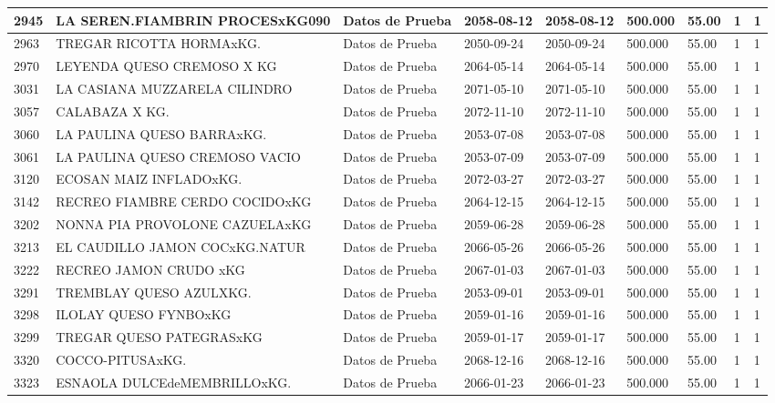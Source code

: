 \documentclass[a4paper,12pt]{article}
\begin{document}
\begin{landscape}
\begin{longtable}{|p{4cm}|p{2.5cm}|p{2.5cm}|p{1.8cm}|p{1.8cm}|p{1cm}|p{1cm}|p{3cm}|p{3cm}||}
2945 & LA SEREN.FIAMBRIN PROCESxKG090 & Datos de Prueba & 2058-08-12 & 2058-08-12 & 500.000 & 55.00 & 1 & 1 \\ \hline 
2963 & TREGAR RICOTTA HORMAxKG. & Datos de Prueba & 2050-09-24 & 2050-09-24 & 500.000 & 55.00 & 1 & 1 \\ \hline 
2970 & LEYENDA QUESO CREMOSO X KG & Datos de Prueba & 2064-05-14 & 2064-05-14 & 500.000 & 55.00 & 1 & 1 \\ \hline 
3031 & LA CASIANA MUZZARELA CILINDRO & Datos de Prueba & 2071-05-10 & 2071-05-10 & 500.000 & 55.00 & 1 & 1 \\ \hline 
3057 & CALABAZA X KG. & Datos de Prueba & 2072-11-10 & 2072-11-10 & 500.000 & 55.00 & 1 & 1 \\ \hline 
3060 & LA PAULINA QUESO BARRAxKG. & Datos de Prueba & 2053-07-08 & 2053-07-08 & 500.000 & 55.00 & 1 & 1 \\ \hline 
3061 & LA PAULINA QUESO CREMOSO VACIO & Datos de Prueba & 2053-07-09 & 2053-07-09 & 500.000 & 55.00 & 1 & 1 \\ \hline 
3120 & ECOSAN MAIZ INFLADOxKG. & Datos de Prueba & 2072-03-27 & 2072-03-27 & 500.000 & 55.00 & 1 & 1 \\ \hline 
3142 & RECREO FIAMBRE CERDO COCIDOxKG & Datos de Prueba & 2064-12-15 & 2064-12-15 & 500.000 & 55.00 & 1 & 1 \\ \hline 
3202 & NONNA PIA PROVOLONE CAZUELAxKG & Datos de Prueba & 2059-06-28 & 2059-06-28 & 500.000 & 55.00 & 1 & 1 \\ \hline 
3213 & EL CAUDILLO JAMON COCxKG.NATUR & Datos de Prueba & 2066-05-26 & 2066-05-26 & 500.000 & 55.00 & 1 & 1 \\ \hline 
3222 & RECREO JAMON CRUDO xKG & Datos de Prueba & 2067-01-03 & 2067-01-03 & 500.000 & 55.00 & 1 & 1 \\ \hline 
3291 & TREMBLAY QUESO AZULXKG. & Datos de Prueba & 2053-09-01 & 2053-09-01 & 500.000 & 55.00 & 1 & 1 \\ \hline 
3298 & ILOLAY QUESO FYNBOxKG & Datos de Prueba & 2059-01-16 & 2059-01-16 & 500.000 & 55.00 & 1 & 1 \\ \hline 
3299 & TREGAR QUESO PATEGRASxKG & Datos de Prueba & 2059-01-17 & 2059-01-17 & 500.000 & 55.00 & 1 & 1 \\ \hline 
3320 & COCCO-PITUSAxKG. & Datos de Prueba & 2068-12-16 & 2068-12-16 & 500.000 & 55.00 & 1 & 1 \\ \hline 
3323 & ESNAOLA DULCEdeMEMBRILLOxKG. & Datos de Prueba & 2066-01-23 & 2066-01-23 & 500.000 & 55.00 & 1 & 1 \\ \hline 

\end{longtable}
\end{landscape}
\end{document}
